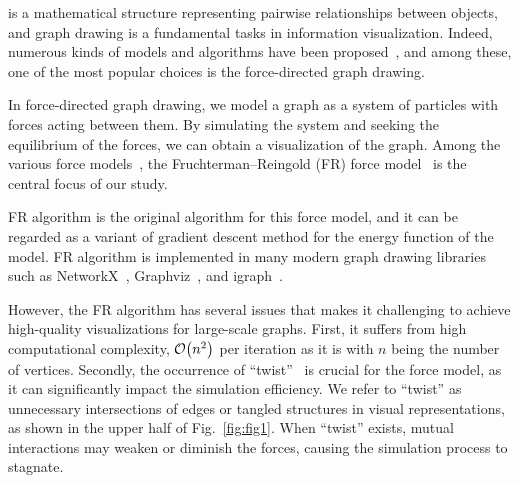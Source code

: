 \documentclass[dvipdfmx,10pt,journal,compsoc]{IEEEtran}
\begin{document}
 is a mathematical structure representing pairwise relationships between objects, and graph drawing is a fundamental tasks in information visualization.
Indeed, numerous kinds of models and algorithms have been proposed~\cite{tutteHowDrawGraph1963,chrobakLineartimeAlgorithmDrawing1995,sugiyamaMethodsVisualUnderstanding1981}, and among these, one of the most popular choices is the force-directed graph drawing.

In force-directed graph drawing, we model a graph as a system of particles with forces acting between them. By simulating the system and seeking the equilibrium of the forces, we can obtain a visualization of the graph.
Among the various force models~\cite{eades1984heuristic,kamadaAlgorithmDrawingGeneral1989}, the Fruchterman--Reingold (FR) force model~\cite{fruchtermanGraphDrawingForcedirected1991,kobourovSpringEmbeddersForce2012} is the central focus of our study.

FR algorithm is the original algorithm for this force model, and it can be regarded as a variant of gradient descent method for the energy function of the model.
FR algorithm is implemented in many modern graph drawing libraries such as NetworkX~\cite{hagberg2008exploring}, Graphviz~\cite{ellsonGraphvizOpenSource2002}, and igraph~\cite{csardiIgraphSoftwarePackage2006}.

However, the FR algorithm has several issues that makes it challenging to achieve high-quality visualizations for large-scale graphs.
First, it suffers from high computational complexity, $\order{n^2}$ per iteration as it is with $n$ being the number of vertices.
Secondly, the occurrence of ``twist''~\cite{cheongSnapshotVisualizationComplex2018} is crucial for the force model, as it can significantly impact the simulation efficiency.
We refer to ``twist'' as unnecessary intersections of edges or tangled structures in visual representations, as shown in the upper half of Fig.~\ref{fig:fig1}.
When ``twist'' exists, mutual interactions may weaken or diminish the forces, causing the simulation process to stagnate.
\end{document}
